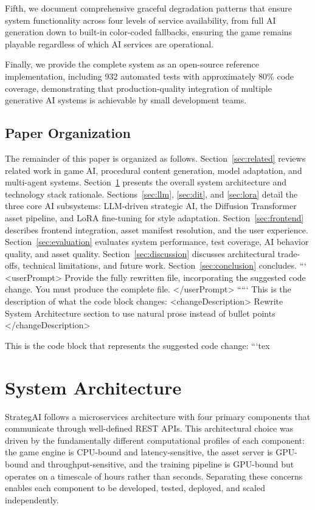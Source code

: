 \documentclass[conference]{IEEEtran}
\begin{document}
Fifth, we document comprehensive graceful degradation patterns that ensure system functionality across four levels of service availability, from full AI generation down to built-in color-coded fallbacks, ensuring the game remains playable regardless of which AI services are operational.

Finally, we provide the complete system as an open-source reference implementation, including 932 automated tests with approximately 80\% code coverage, demonstrating that production-quality integration of multiple generative AI systems is achievable by small development teams.

\subsection{Paper Organization}

The remainder of this paper is organized as follows. Section~\ref{sec:related} reviews related work in game AI, procedural content generation, model adaptation, and multi-agent systems. Section~\ref{sec:architecture} presents the overall system architecture and technology stack rationale. Sections~\ref{sec:llm}, \ref{sec:dit}, and \ref{sec:lora} detail the three core AI subsystems: LLM-driven strategic AI, the Diffusion Transformer asset pipeline, and LoRA fine-tuning for style adaptation. Section~\ref{sec:frontend} describes frontend integration, asset manifest resolution, and the user experience. Section~\ref{sec:evaluation} evaluates system performance, test coverage, AI behavior quality, and asset quality. Section~\ref{sec:discussion} discusses architectural trade-offs, technical limitations, and future work. Section~\ref{sec:conclusion} concludes.
```
<userPrompt>
Provide the fully rewritten file, incorporating the suggested code change. You must produce the complete file.
</userPrompt>
`````
This is the description of what the code block changes:
<changeDescription>
Rewrite System Architecture section to use natural prose instead of bullet points
</changeDescription>

This is the code block that represents the suggested code change:
```tex
\section{System Architecture}
\label{sec:architecture}

StrategAI follows a microservices architecture with four primary components that communicate through well-defined REST APIs. This architectural choice was driven by the fundamentally different computational profiles of each component: the game engine is CPU-bound and latency-sensitive, the asset server is GPU-bound and throughput-sensitive, and the training pipeline is GPU-bound but operates on a timescale of hours rather than seconds. Separating these concerns enables each component to be developed, tested, deployed, and scaled independently.
\end{document}
